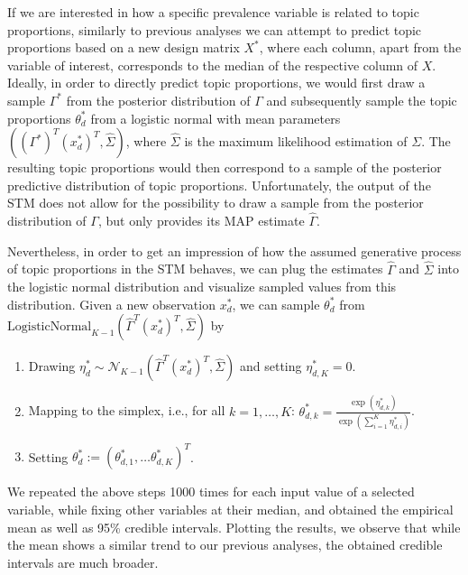 If we are interested in how a specific prevalence variable is related to topic proportions, similarly to previous analyses we can attempt to predict topic proportions based on a new design matrix $X^*$, where each column, apart from the variable of interest, corresponds to the median of the respective column of $X$. Ideally, in order to directly predict topic proportions, we would first draw a sample $\Gamma^*$ from the posterior distribution of $\Gamma$ and subsequently sample the topic proportions $\theta_d^*$ from a logistic normal with mean parameters $((\Gamma^*)^T (x_d^*)^T, \hat{\Sigma})$, where $\hat{\Sigma}$ is the maximum likelihood estimation of $\Sigma$. The resulting topic proportions would then correspond to a sample of the posterior predictive distribution of topic proportions. Unfortunately, the output of the STM does not allow for the possibility to draw a sample from the posterior distribution of $\Gamma$, but only provides its MAP estimate $\hat{\Gamma}$. 

Nevertheless, in order to get an impression of how the assumed generative process of topic proportions in the STM behaves, we can plug the estimates $\hat{\Gamma}$ and $\hat{\Sigma}$ into the logistic normal distribution and visualize sampled values from this distribution. Given a new observation $x_d^*$, we can sample $\theta_d^*$ from $\text{LogisticNormal}_{K-1}(\hat{\Gamma}^T(x_d^*)^T, \hat{\Sigma})$ by

\begin{enumerate}
\item Drawing $\eta_d^* \sim \mathcal{N}_{K-1}(\hat{\Gamma}^T(x_d^*)^T, \hat{\Sigma})$ and setting $\eta^*_{d,K} = 0$.
\item Mapping to the simplex, i.e., for all $k = 1,\dots,K$: $\theta_{d,k}^* = \frac{\exp(\eta^*_{d,k})}{\exp(\sum_{i=1}^{K} \eta^*_{d,i})}$.
\item Setting $\theta_d^* := (\theta_{d,1}^*, \dots \theta_{d,K}^*)^T$.
\end{enumerate}

We repeated the above steps 1000 times for each input value of a selected variable, while fixing other variables at their median, and obtained the empirical mean as well as 95\% credible intervals. Plotting the results, we observe that while the mean shows a similar trend to our previous analyses, the obtained credible intervals are much broader.

